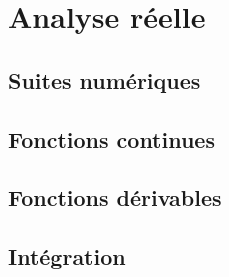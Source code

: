 \documentclass[a4paper,11pt]{book}
\begin{document}
\frontmatter




{\hfuzz=4pt\tableofcontents}
\clearpage

\mainmatter{}

\part{Analyse réelle}

\chapter{Suites numériques}


\clearpage


\clearpage

\chapter{Fonctions continues}


\clearpage

\chapter{Fonctions dérivables}


\clearpage


\clearpage

\chapter{Intégration}


\clearpage


\clearpage


\clearpage


\clearpage


\clearpage
\end{document}
